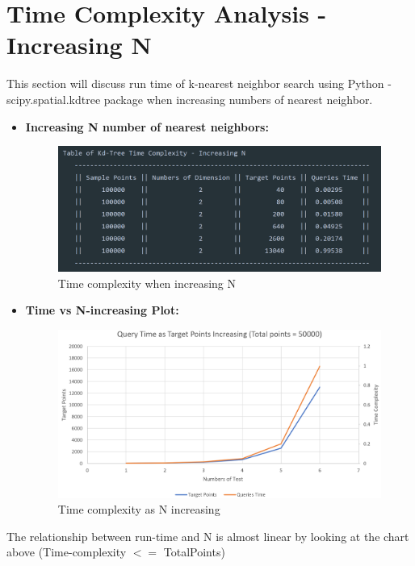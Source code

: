 \documentclass[12pt]{article}
\newcommand\tab[1][0.6cm]{\hspace*{#1}}
\begin{document}
    \section{\large Time Complexity Analysis - Increasing N}
    \tab This section will discuss run time of k-nearest neighbor search using Python - scipy.spatial.kdtree package when increasing numbers of nearest neighbor.
    \begin{itemize}
    \item \textbf{Increasing N number of nearest neighbors:} 
    \begin{figure}[H]
    	\centering
    	\includegraphics[width=14cm]{k-nearest-N-increase.png}
    	\caption{Time complexity when increasing N} 
    	\label{fig:1}
    \end{figure}
    \item \textbf{Time vs N-increasing Plot:}
    \begin{figure}[H]
    	\centering
    	\includegraphics[width=13cm]{excel-N.PNG}
    	\caption{Time complexity as N increasing} 
    	\label{fig:2}
    	
    \end{figure}
    \end{itemize}
    \tab The relationship between run-time and N is almost linear by looking at the chart above (Time-complexity $<=$ TotalPoints)
\end{document}
